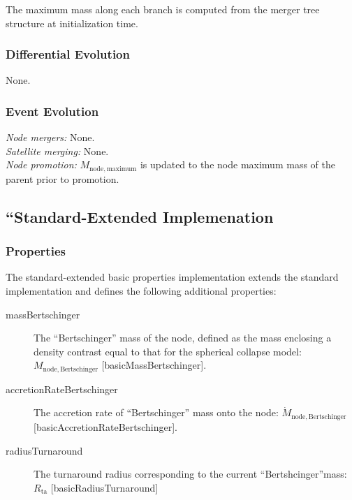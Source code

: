 The maximum mass along each branch is computed from the merger tree structure at initialization time.

\subsubsection{Differential Evolution}

None.

\subsubsection{Event Evolution}

\noindent\emph{Node mergers:} None.\\

\noindent\emph{Satellite merging:} None.\\

\noindent\emph{Node promotion:} $M_\mathrm{node, maximum}$ is updated to the \gls{node} maximum mass of the parent prior to promotion.\\

\subsection{``Standard-Extended Implemenation}

\subsubsection{Properties}

The standard-extended basic properties implementation extends the standard implementation and defines the following additional properties:
\begin{description}
 \item [{\normalfont \ttfamily massBertschinger}] The ``Bertschinger'' mass of the node, defined as the mass enclosing a density contrast equal to that for the spherical collapse model: $M_\mathrm{node, Bertschinger}$ [{\normalfont \ttfamily basicMassBertschinger}].
 \item [{\normalfont \ttfamily accretionRateBertschinger}] The accretion rate of ``Bertschinger'' mass onto the node: $\dot{M}_\mathrm{node, Bertschinger}$ [{\normalfont \ttfamily basicAccretionRateBertschinger}].
 \item [{\normalfont \ttfamily radiusTurnaround}] The turnaround radius corresponding to the current ``Bertshcinger''mass: $R_\mathrm{ta}$ [{\normalfont \ttfamily basicRadiusTurnaround}]
\end{description}

